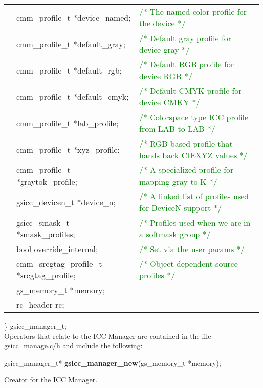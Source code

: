 \documentclass[12pt,notitlepage]{article}
\begin{document}
\begin{tabular}{lll}
  & cmm\_profile\_t *device\_named;   & 	\textcolor{green}{/* The named color profile for the device */}  \\
  & cmm\_profile\_t *default\_gray;   & 	\textcolor{green}{/* Default gray profile for device gray */}   \\
  & cmm\_profile\_t *default\_rgb;    &	 \textcolor{green}{/* Default RGB profile for device RGB */}    \\
  & cmm\_profile\_t *default\_cmyk;   & 	\textcolor{green}{/* Default CMYK profile for device CMKY */} \\
  & cmm\_profile\_t *lab\_profile;    &  \textcolor{green}{/* Colorspace type ICC profile from LAB to LAB */}   \\
  & cmm\_profile\_t *xyz\_profile;    &  \textcolor{green}{/* RGB based profile that hands back CIEXYZ values */}   \\
  & cmm\_profile\_t *graytok\_profile;&  \textcolor{green}{/* A specialized profile for mapping gray to K */}   \\
  & gsicc\_devicen\_t *device\_n;     &  \textcolor{green}{/* A linked list of profiles used for DeviceN support */} \\
  & gsicc\_smask\_t *smask\_profiles; &  \textcolor{green}{/* Profiles used when we are in a softmask group */ } \\
  & bool override\_internal; &  \textcolor{green}{/* Set via the user params */ } \\
  & cmm\_srcgtag\_profile\_t *srcgtag\_profile; &  \textcolor{green}{/* Object dependent source profiles */ } \\
  &       gs\_memory\_t *memory;    & \\
  &       rc\_header rc; &
\end{tabular}

\noindent  \} gsicc\_manager\_t;\\

\noindent Operators that relate to the ICC Manager are contained in the file gsicc\_manage.c/h and include the following:\\

\begin{tabbing}
\noindent gsicc\_manager\_t* {\bf gsicc\_manager\_new}(gs\_memory\_t *memory);\\
\end{tabbing}

\begin{minipage}[h]{6.0in}
Creator for the ICC Manager.
\end{minipage}\\
\\
\end{document}
